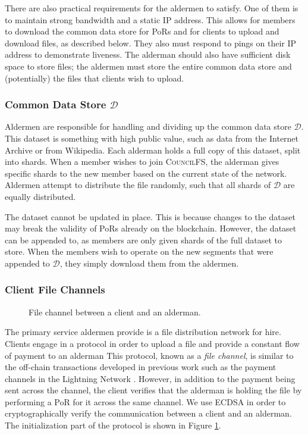 \documentclass{article}
\begin{document}
There are also practical requirements for the aldermen to satisfy. One of them
is to maintain strong bandwidth and a static IP address. This allows for members
to download the common data store for PoRs and for clients to upload and
download files, as described below. They also must respond to pings on their IP
address to demonstrate liveness. The alderman should also have sufficient disk
space to store files; the aldermen must store the entire common data store and
(potentially) the files that clients wish to upload.

\subsubsection{Common Data Store $\mathcal{D}$}

Aldermen are responsible for handling and dividing up the common data store
$\mathcal{D}$. This dataset is something with high public value, such as data
from the Internet Archive or from Wikipedia. Each alderman holds a full copy of
this dataset, split into shards. When a member wishes to join
\textsc{CouncilFS}, the alderman gives specific shards to the new member based
on the current state of the network. Aldermen attempt to distribute the file
randomly, such that all shards of $\mathcal{D}$ are equally distributed.

The dataset cannot be updated in place. This is because changes to the dataset
may break the validity of PoRs already on the blockchain. However, the dataset
can be appended to, as members are only given shards of the full dataset to
store. When the members wish to operate on the new segments that were appended
to $\mathcal{D}$, they simply download them from the aldermen.

\subsubsection{Client File Channels}

\begin{figure}[t]
  \centering
  \fbox{\rule[-.5cm]{4cm}{4cm} \rule[-.5cm]{4cm}{0cm}}
  \caption{File channel between a client and an alderman.}
  \label{fig:channel}
\end{figure}

The primary service aldermen provide is a file distribution network for hire.
Clients engage in a protocol in order to upload a file and provide a constant
flow of payment to an alderman This
protocol, known as a \emph{file channel}, is similar to the off-chain
transactions developed in previous work such as the payment channels in the
Lightning Network \cite{lightning}. However, in addition to the payment being
sent across the channel, the client verifies that the alderman is holding the
file by performing a PoR for it across the same channel. We use ECDSA in order
to cryptographically verify the communication between a client and an alderman.
The initialization part of the protocol is shown in Figure \ref{fig:channel}.
\end{document}
